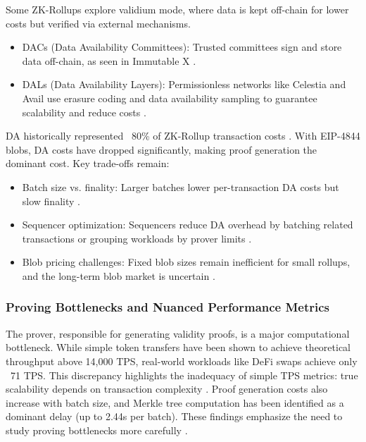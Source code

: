 Some ZK-Rollups explore validium mode, where data is kept off-chain for lower costs but verified via external mechanisms.
\vspace{12pt}
\begin{itemize}
\item DACs (Data Availability Committees): Trusted committees sign and store data off-chain, as seen in Immutable X \cite{gogol2025scalingdefi}.
\item DALs (Data Availability Layers): Permissionless networks like Celestia and Avail use erasure coding and data availability sampling to guarantee scalability and reduce costs \cite{celestia_how}.
\end{itemize}

DA historically represented ~80\% of ZK-Rollup transaction costs \cite{stephan2025crowdprove}. With EIP-4844 blobs, DA costs have dropped significantly, making proof generation the dominant cost. Key trade-offs remain:
\vspace{12pt}
\begin{itemize}
\item Batch size vs. finality: Larger batches lower per-transaction DA costs but slow finality \cite{chaliasos2024analyzing}.
\item Sequencer optimization: Sequencers reduce DA overhead by batching related transactions or grouping workloads by prover limits \cite{chaliasos2024analyzing}.
\item Blob pricing challenges: Fixed blob sizes remain inefficient for small rollups, and the long-term blob market is uncertain \cite{gogol2025scalingdefi}.
\end{itemize}

\subsubsection{Proving Bottlenecks and Nuanced Performance Metrics}
\vspace{12pt}
The prover, responsible for generating validity proofs, is a major computational bottleneck. While simple token transfers have been shown to achieve theoretical throughput above 14,000 TPS, real-world workloads like DeFi swaps achieve only ~71 TPS. This discrepancy highlights the inadequacy of simple TPS metrics: true scalability depends on transaction complexity \cite{gogol2025scalingdefi}. Proof generation costs also increase with batch size, and Merkle tree computation has been identified as a dominant delay (up to 2.44s per batch). These findings emphasize the need to study proving bottlenecks more carefully \cite{gogol2025scalingdefi}.

